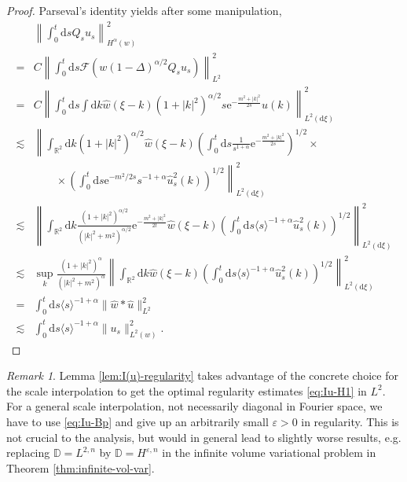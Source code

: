 \documentclass[11pt, a4paper]{scrartcl}
\numberwithin{equation}{section}
\theoremstyle{plain}
\theoremstyle{remark}
\newtheorem{remark}[foo]{Remark}
\newcommand{\mathd}{\mathrm{d}}
\newcommand{\mathe}{\mathrm{e}}
\begin{document}
\begin{proof}
  Parseval's identity yields after some manipulation,
 {\small\begin{align*}
       & \left\| \int_0^t \mathd s Q_s u_s \right\|_{H^{\alpha} (w)}^2\\
       = & C \left\| \int_0^t \mathd s \mathcal{F} (w (1 - \Delta)^{\alpha /
       2} Q_s u_s) \right\|^2_{L^2}\\
       = & C \left\| \int_0^t \mathd s \int \mathd k \hat{w} (\xi - k) (1 + |
       k |^2)^{\alpha / 2} s \mathe^{- \frac{m^2 + | k |^2}{2 s}}  \hat{u} (k)
       \right\|_{L^2 (\mathd \xi)}^2\\
       \lesssim & \left\| \int_{\mathbb{R}^2} \mathd k (1 + | k |^2)^{\alpha /
       2}  \hat{w} (\xi - k) \left( \int_0^t \mathd s \frac{1}{s^{1 + \alpha}}
       \mathe^{- \frac{m^2 + | k |^2}{2 s}} \right)^{1 / 2} \times\right.\\&\qquad\times \left. \left( \int_0^t
       \mathd s \mathe^{- m^2 / 2 s} s^{- 1 + \alpha} \hat{u}_s^2 (k)
       \right)^{1 / 2} \right\|_{L^2 (\mathd \xi)}^2\\
       \lesssim & \left\| \int_{\mathbb{R}^2} \mathd k \frac{(1 + | k
       |^2)^{\alpha / 2}}{(| k |^2 + m^2)^{\alpha / 2}} \mathe^{- \frac{m^2 +
       | k |^2}{2 t}}  \hat{w} (\xi - k) \left( \int_0^t \mathd s \langle s
       \rangle^{- 1 + \alpha}  \hat{u}_s^2 (k) \right)^{1 / 2} \right\|^2_{L^2
       (\mathd \xi)}\\
       \lesssim & \sup_k  \frac{(1 + | k |^2)^{\alpha}}{(| k |^2 +
       m^2)^{\alpha}} \left\| \int_{\mathbb{R}^2} \mathd k \hat{w} (\xi - k) 
       \left( \int_0^t \mathd s \langle s \rangle^{- 1 + \alpha}  \hat{u}_s^2
       (k) \right)^{1 / 2} \right\|^2_{L^2 (\mathd \xi)}\\
       = & \int_0^t \mathd s \langle s \rangle^{- 1 + \alpha} \| \hat{w} \ast
       \hat{u} \|_{L^2}^2\\
       \lesssim & \int_0^t \mathd s \langle s \rangle^{- 1 + \alpha} \| u_s
       \|_{L^2 (w)}^2 .
     \end{align*}}
  
\end{proof}

\begin{remark}
  Lemma \ref{lem:I(u)-regularity} takes advantage of the concrete choice for
  the scale interpolation to get the optimal regularity estimates
  \eqref{eq:Iu-H1} in $L^2$. For a general scale interpolation, not
  necessarily diagonal in Fourier space, we have to use \eqref{eq:Iu-Bp} and
  give up an arbitrarily small $\varepsilon > 0$ in regularity. This is not
  crucial to the analysis, but would in general lead to slightly worse
  results, e.g. replacing $\mathbb{D}= L^{2, n}$ by $\mathbb{D}=
  H^{\varepsilon, n}$ in the infinite volume variational problem in Theorem
  \ref{thm:infinite-vol-var}.
\end{remark}
\end{document}
